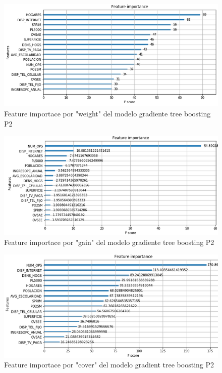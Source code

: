 \documentclass[9pt,twocolumn,twoside]{ilcss}
\begin{document}
\begin{appendices}
\begin{figure}[tbhp]
	\centering
	\includegraphics[width=1\linewidth]{images/p2_xgboost_weight.png}
	\caption{Feature importace por "weight" del modelo gradiente tree boosting P2}
	\label{fig:p2_xgboost_weight}
\end{figure}

\begin{figure}[tbhp]
	\centering
	\includegraphics[width=1\linewidth]{images/p2_xgboost_gain.png}
	\caption{Feature importace por "gain" del modelo gradiente tree boosting P2}
	\label{fig:p3_xgboost_gain}
\end{figure}

\begin{figure}[tbhp]
	\centering
	\includegraphics[width=1\linewidth]{images/p2_xgboost_cover.png}\newpage
	\caption{Feature importace por "cover" del modelo gradient tree boosting P2}
\label{fig:p2_xgboost_cover}
\end{figure}

\end{appendices}
\end{document}
